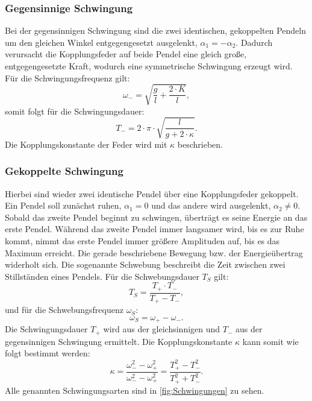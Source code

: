 \subsubsection{Gegensinnige Schwingung}
Bei der gegensinnigen Schwingung sind die zwei identischen, gekoppelten Pendeln um den gleichen Winkel entgegengesetzt ausgelenkt, $\alpha_1 = - \alpha_2$.
Dadurch verursacht die Kopplungsfeder auf beide Pendel eine gleich große, entgegengesetzte Kraft, wodurch eine symmetrische Schwingung erzeugt wird.
Für die Schwingungsfrequenz gilt:
\begin{equation*}
    \omega_- = \sqrt{\frac{g}{l} + \frac{2 \cdot K}{l}},
\end{equation*}
somit folgt für die Schwingungsdauer:
\begin{equation} \label{eqn:Tminus}
    T_- =2 \cdot \pi \cdot \sqrt{\frac{l}{g + 2 \cdot \kappa}}.
\end{equation}
Die Kopplungskonstante der Feder wird mit $\kappa$ beschrieben.

\subsubsection{Gekoppelte Schwingung}
Hierbei sind wieder zwei identische Pendel über eine Kopplungsfeder gekoppelt.
Ein Pendel soll zunächst ruhen, $\alpha_1 = 0$ und das andere wird ausgelenkt, $\alpha_2 \neq 0$.
Sobald das zweite Pendel beginnt zu schwingen, überträgt es seine Energie an das erste Pendel.
Während das zweite Pendel immer langsamer wird, bis es zur Ruhe kommt, nimmt das erste Pendel immer größere Amplituden auf, bis es das Maximum erreicht.
Die gerade beschriebene Bewegung bzw. der Energieübertrag widerholt sich.
Die sogenannte Schwebung beschreibt die Zeit zwischen zwei Stillständen eines Pendels.
Für die Schwebungsdauer $T_S$ gilt:
\begin{equation}\label{eqn:Ts}
    T_S = \frac{T_+ \cdot T_-}{T_+ - T_-},
\end{equation}
und für die Schwebungsfrequenz $\omega_S$:
\begin{equation} \label{eqn:ws}
    \omega_S = \omega_+ - \omega_-.
\end{equation}
Die Schwingungsdauer $T_+$ wird aus der gleichsinnigen und $T_-$ aus der gegensinnigen Schwingung ermittelt.
Die Kopplungskonstante $\kappa$ kann somit wie folgt bestimmt werden:
\begin{equation} \label{eqn:kappa}
    \kappa = \frac{\omega_-^2 - \omega_+^2}{\omega_-^2 - \omega_+^2} = \frac{T_+^2 - T_-^2}{T_+^2 + T_-^2}.
\end{equation}
\noindent
Alle genannten Schwingungsarten sind in \autoref{fig:Schwingungen} zu sehen.

